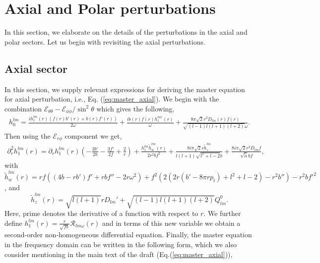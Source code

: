 \documentclass[11pt]{article}
\begin{document}

\section{Axial and Polar perturbations}\label{App_axial_polar}
In this section, we elaborate on the details of the perturbations in the axial and polar sectors. Let us begin with revisiting the axial perturbations.

\subsection{Axial sector}\label{App_axial}
 In this section, we supply relevant expressions for deriving the master equation for axial perturbation, i.e., Eq. (\ref{eq:master_axial}). We begin with the  combination $\mathcal{E_{\theta\theta}}-\mathcal{E_{\phi\phi}}/\sin^{2}\theta$ which gives the following, 
\begin{align}
    h_{0}^{lm} = \frac{i h_{1}^{lm}(r) (f(r) b'(r)+b(r) f'(r))}{2 \omega }+\frac{i b(r) f(r) h_{1}^{lm'}(r)}{\omega }+\frac{8 \pi  \sqrt{2} r^2 D_{lm}(r) f(r)}{\sqrt{(l-1) l (l+1) (l+2)} \omega }.
\end{align}
Then using the $\mathcal{E}_{r\phi}$ component we get, 
\begin{equation}
\begin{aligned}
 \partial^{2}_{r}h_{1}^{lm}(r) = \partial_{r}h_{1}^{lm}(r) (-\frac{3 b'}{2 b}-\frac{3 f'}{2 f}+\frac{2}{r})+\frac{h_{1}^{lm} \tilde{h}_{w}^{lm}(r)}{2 r^{2} b f^{2}}+\frac{8 i \pi  \sqrt{2} r \tilde{h}^{lm}_{z}}{l (l+1) \sqrt{l^{2}+l-2} b} +\frac{8 i \pi  \sqrt{2} r^{2} D_{lm} f}{\sqrt{\tilde{n}} b f},
\end{aligned}
\end{equation}
with $$\tilde{h}_{w}^{lm}(r)=r f \left(\left(4 b-r b'\right) f'+r b f''-2 r \omega ^2\right)+f^2 \left(2 \left(2 r \left(b'-8 \pi  r p_{t}\right)+l^2+l-2\right)-r^2 b''\right)-r^2 b f'^2$$, and $$\tilde{h}^{lm}_{z}(r)=\sqrt{l (l+1)} r D_{lm}'+\sqrt{(l-1) l (l+1) (l+2)} Q^{0}_{lm}.$$
Here, prime denotes the derivative of a function with respect to $r$. We further define  $h_{1}^{lm}(r)=\frac{r}{\sqrt{fb}}\mathcal{R}_{lm\omega}(r)$ and in terms of this new variable we obtain a second-order non-homogeneous differential equation. Finally, the master equation in the frequency domain can be written in the following form, which we also consider mentioning in the main text of the draft (Eq.(\ref{eq:master_axial})),
\end{document}
